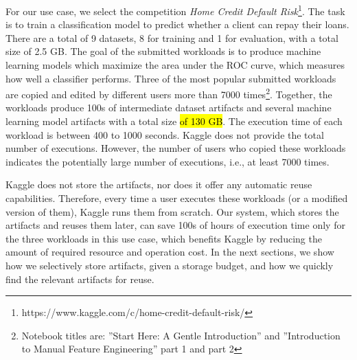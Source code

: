 For our use case, we select the competition \textit{Home Credit Default Risk}\footnote{https://www.kaggle.com/c/home-credit-default-risk/}.
The task is to train a classification model to predict whether a client can repay their loans.
There are a total of 9 datasets, 8 for training and 1 for evaluation, with a total size of 2.5 GB.
The goal of the submitted workloads is to produce machine learning models which maximize the area under the ROC curve, which measures how well a classifier performs.
Three of the most popular submitted workloads are copied and edited by different users more than 7000 times\footnote{Notebook titles are: ''Start Here: A Gentle Introduction'' and ''Introduction to Manual Feature Engineering'' part 1 and part 2}.
Together, the workloads produce 100s of intermediate dataset artifacts and several machine learning model artifacts with a total size \hl{of 130 GB}.
The execution time of each workload is between 400 to 1000 seconds.
Kaggle does not provide the total number of executions.
However, the number of users who copied these workloads indicates the potentially large number of executions, i.e., at least 7000 times.

Kaggle does not store the artifacts, nor does it offer any automatic reuse capabilities.
Therefore, every time a user executes these workloads (or a modified version of them), Kaggle runs them from scratch.
Our system, which stores the artifacts and reuses them later, can save 100s of hours of execution time only for the three workloads in this use case, which benefits Kaggle by reducing the amount of required resource and operation cost.
In the next sections, we show how we selectively store artifacts, given a storage budget, and how we quickly find the relevant artifacts for reuse.